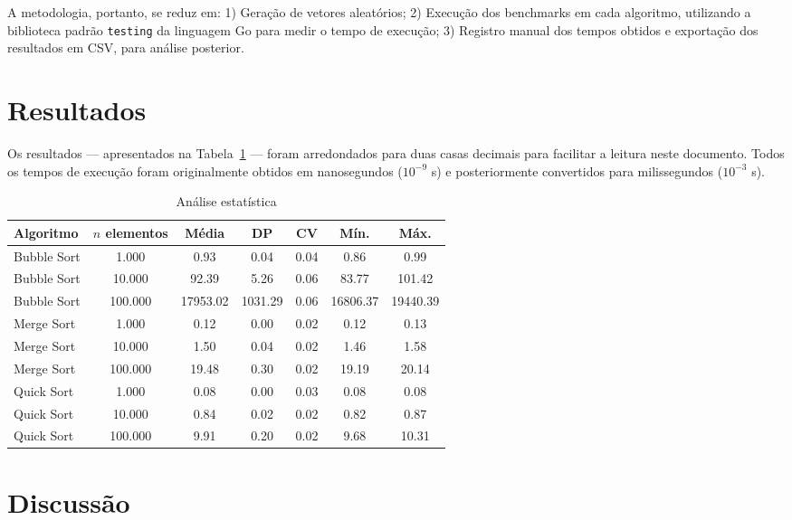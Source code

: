 \documentclass[12pt]{article}
\begin{document}
A metodologia, portanto, se reduz em: 1) Geração de vetores aleatórios; 2) Execução dos benchmarks em cada algoritmo, utilizando a biblioteca padrão \texttt{testing} da linguagem Go para medir o tempo de execução; 3) Registro manual dos tempos obtidos e exportação dos resultados em CSV, para análise posterior.

\section{Resultados}

Os resultados --- apresentados na Tabela~\ref{tab:estatisticas_ms} --- foram arredondados para duas casas decimais para facilitar a leitura neste documento. Todos os tempos de execução foram originalmente obtidos em nanosegundos ($10^{-9}$ s) e posteriormente convertidos para milissegundos ($10^{-3}$ s).

\begin{table}[h!]
\centering
\caption{Análise estatística}
\label{tab:estatisticas_ms}
\begin{tabular}{|l|c|c|c|c|c|c|}
\hline
\textbf{Algoritmo} & \textbf{$n$ elementos} & \textbf{Média} & \textbf{DP} & \textbf{CV} & \textbf{Mín.} & \textbf{Máx.} \\ \hline
Bubble Sort & 1.000 & 0.93 & 0.04 & 0.04 & 0.86 & 0.99 \\ 
Bubble Sort & 10.000 & 92.39 & 5.26 & 0.06 & 83.77 & 101.42 \\ 
Bubble Sort & 100.000 & 17953.02 & 1031.29 & 0.06 & 16806.37 & 19440.39 \\ \hline
Merge Sort & 1.000 & 0.12 & 0.00 & 0.02 & 0.12 & 0.13 \\ 
Merge Sort & 10.000 & 1.50 & 0.04 & 0.02 & 1.46 & 1.58 \\ 
Merge Sort & 100.000 & 19.48 & 0.30 & 0.02 & 19.19 & 20.14 \\ \hline
Quick Sort & 1.000 & 0.08 & 0.00 & 0.03 & 0.08 & 0.08 \\ 
Quick Sort & 10.000 & 0.84 & 0.02 & 0.02 & 0.82 & 0.87 \\ 
Quick Sort & 100.000 & 9.91 & 0.20 & 0.02 & 9.68 & 10.31 \\ \hline
\end{tabular}
\end{table}

\section{Discussão}
\end{document}
